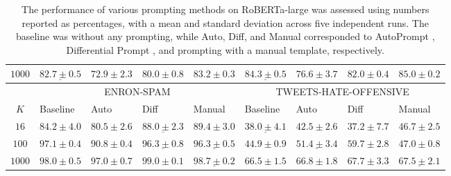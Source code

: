 \begin{table*}[!ht]
{\begin{tabular}{c | llll | llll }
        $1000$
        & $\underline{82.7 \pm 0.5}$
        & $72.9 \pm 2.3$
        & $80.0 \pm 0.8$
        & $\boldsymbol{83.2 \pm 0.3}$
        & $\underline{84.3 \pm 0.5}$
        & $76.6 \pm 3.7$
        & $82.0 \pm 0.4$
        & $\boldsymbol{85.0 \pm 0.2}$ \\
        \midrule
	\multicolumn{1}{c}{}                      
	& \multicolumn{4}{c}{ENRON-SPAM}                      
	& \multicolumn{4}{c}{TWEETS-HATE-OFFENSIVE} \\
	$K$
	& Baseline & Auto	& Diff	& Manual  
	& Baseline & Auto	& Diff	& Manual  
	\\
        \midrule
        $16$
        & $84.2 \pm 4.0$
        & $80.5 \pm 2.6$
        & $\underline{88.0 \pm 2.3}$
        & $\boldsymbol{89.4 \pm 3.0}$
        & $\underline{38.0 \pm 4.1}$
        & $42.5 \pm 2.6$
        & $37.2 \pm 7.7$
        & $\boldsymbol{46.7 \pm 2.5}$ \\
        $100$
        & $\boldsymbol{97.1 \pm 0.4}$
        & $90.8 \pm 0.4$
        & $\underline{96.3 \pm 0.8}$
        & $\underline{96.3 \pm 0.5}$
        & $44.9 \pm 0.9$
        & $\underline{51.4 \pm 3.4}$
        & $\boldsymbol{59.7 \pm 2.8}$
        & $47.0 \pm 0.8$ \\	
        $1000$
        & $98.0 \pm 0.5$
        & $97.0 \pm 0.7$
        & $\boldsymbol{99.0 \pm 0.1}$
        & $\underline{98.7 \pm 0.2}$
        & $66.5 \pm 1.5$
        & $66.8 \pm 1.8$
        & $\boldsymbol{67.7 \pm 3.3}$
        & $\underline{67.5 \pm 2.1}$ \\
        \bottomrule
        \end{tabular}
 }
 \caption{The performance of various prompting methods on RoBERTa-large \cite{liu2019roberta} was assessed using numbers reported as percentages, with a mean and standard deviation across five independent runs. The baseline was without any prompting, while Auto, Diff, and Manual corresponded to AutoPrompt \cite{shin2020autoprompt}, Differential Prompt \cite{zhang2021differentiable}, and prompting with a manual template, respectively.}
 \label{tab:glue}
\end{table*}